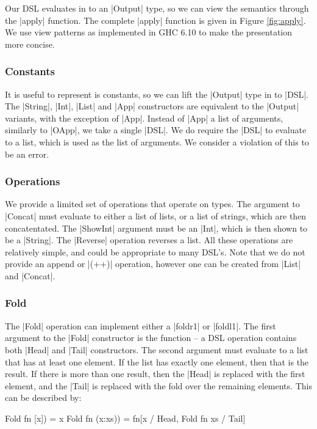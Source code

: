\documentclass[preprint,draft]{sigplanconf}
\begin{document}
Our DSL evaluates in to an |Output| type, so we can view the semantics through the |apply| function. The complete |apply| function is given in Figure \ref{fig:apply}. We use view patterns as implemented in GHC 6.10 \cite{ghc} to make the presentation more concise.

\subsubsection{Constants}

It is useful to represent is constants, so we can lift the |Output| type in to |DSL|. The |String|, |Int|, |List| and |App| constructors are equivalent to the |Output| variants, with the exception of |App|. Instead of |App| a list of arguments, similarly to |OApp|, we take a single |DSL|. We do require the |DSL| to evaluate to a list, which is used as the list of arguments. We consider a violation of this to be an error.

\subsubsection{Operations}

We provide a limited set of operations that operate on types. The argument to |Concat| must evaluate to either a list of lists, or a list of strings, which are then concatentated. The |ShowInt| argument must be an |Int|, which is then shown to be a |String|. The |Reverse| operation reverses a list. All these operations are relatively simple, and could be appropriate to many DSL's. Note that we do not provide an append or |(++)| operation, however one can be created from |List| and |Concat|.

\subsubsection{Fold}

The |Fold| operation can implement either a |foldr1| or |foldl1|. The first argument to the |Fold| constructor is the function -- a DSL operation contains both |Head| and |Tail| constructors. The second argument must evaluate to a list that has at least one element. If the list has exactly one element, then that is the result. If there is more than one result, then the |Head| is replaced with the first element, and the |Tail| is replaced with the fold over the remaining elements. This can be described by:

\ignore\begin{code}
Fold fn [x]) = x
Fold fn (x:xs)) = fn[x / Head, Fold fn xs / Tail]
\end{code}
\end{document}
